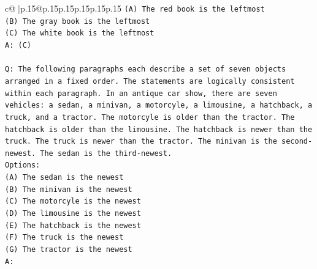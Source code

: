 \documentclass{article}
\begin{document}
{\begin{supertabular}{c@{$\;$}|p{.15\linewidth}@{}p{.15\linewidth}p{.15\linewidth}p{.15\linewidth}p{.15\linewidth}p{.15\linewidth}}
{{{\texttt{(A) The red book is the leftmost} \\
\texttt{(B) The gray book is the leftmost} \\
\texttt{(C) The white book is the leftmost} \\
\texttt{A: (C)} \\
\\ 
\texttt{Q: The following paragraphs each describe a set of seven objects arranged in a fixed order. The statements are logically consistent within each paragraph. In an antique car show, there are seven vehicles: a sedan, a minivan, a motorcyle, a limousine, a hatchback, a truck, and a tractor. The motorcyle is older than the tractor. The hatchback is older than the limousine. The hatchback is newer than the truck. The truck is newer than the tractor. The minivan is the second{-}newest. The sedan is the third{-}newest.} \\
\texttt{Options:} \\
\texttt{(A) The sedan is the newest} \\
\texttt{(B) The minivan is the newest} \\
\texttt{(C) The motorcyle is the newest} \\
\texttt{(D) The limousine is the newest} \\
\texttt{(E) The hatchback is the newest} \\
\texttt{(F) The truck is the newest} \\
\texttt{(G) The tractor is the newest} \\
\texttt{A:} \\
            }
        }
    }
     \\ \\


\end{supertabular}}
\end{document}
